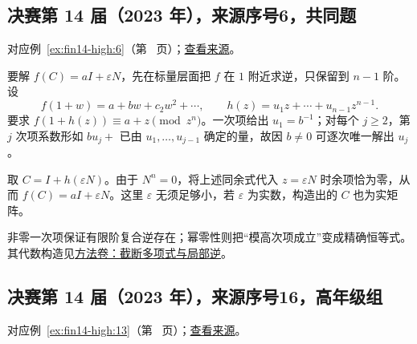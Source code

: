 \documentclass[12pt,fontset=fandol]{ctexart}
\begin{document}
\subsection{决赛第 14 届（2023 年），来源序号6，共同题}\label{ans:fin14-high:6}\label{pr:fin14-high:6}

对应例~\ref{ex:fin14-high:6}（第~\pageref{ex:fin14-high:6} 页）；\href{https://github.com/lzxcr/cmc-mathematics/blob/64916fa1fdbc3e444a652eca204d5669058ee321/src/problems/finals/14/06.md}{查看来源}。

\begin{solve}

要解 $f(C)=aI+\varepsilon N$，先在标量层面把 $f$ 在 $1$ 附近求逆，只保留到 $n-1$ 阶。设
\[
f(1+w)=a+bw+c_2w^2+\cdots,
\qquad h(z)=u_1z+\cdots+u_{n-1}z^{n-1}.
\]
要求 $f(1+h(z))\equiv a+z\pmod{z^n}$。一次项给出 $u_1=b^{-1}$；对每个 $j\ge2$，第 $j$ 次项系数形如 $bu_j+$ 已由 $u_1,\ldots,u_{j-1}$ 确定的量，故因 $b\ne0$ 可逐次唯一解出 $u_j$。

取 $C=I+h(\varepsilon N)$。由于 $N^n=0$，将上述同余式代入 $z=\varepsilon N$ 时余项恰为零，从而 $f(C)=aI+\varepsilon N$。这里 $\varepsilon$ 无须足够小，若 $\varepsilon$ 为实数，构造出的 $C$ 也为实矩阵。

\end{solve}

\begin{remark}[方法与条件]

非零一次项保证有限阶复合逆存在；幂零性则把“模高次项成立”变成精确恒等式。其代数构造见\hyperref[app:algebra-interpolation]{方法卷：截断多项式与局部逆}。

\end{remark}

\subsection{决赛第 14 届（2023 年），来源序号16，高年级组}\label{ans:fin14-high:13}\label{pr:fin14-high:13}

对应例~\ref{ex:fin14-high:13}（第~\pageref{ex:fin14-high:13} 页）；\href{https://github.com/lzxcr/cmc-mathematics/blob/64916fa1fdbc3e444a652eca204d5669058ee321/src/problems/finals/14/16.md}{查看来源}。
\end{document}
